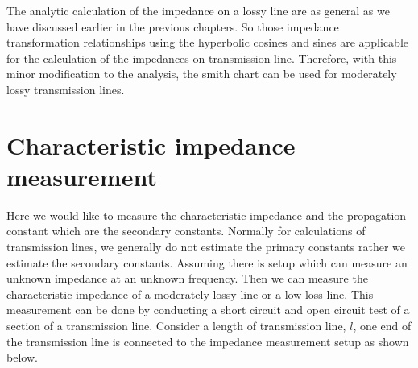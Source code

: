 The analytic calculation of the impedance on a lossy line are as general as we have discussed earlier in the previous chapters. So those impedance transformation relationships using the hyperbolic cosines and sines are applicable for the calculation of the impedances on transmission line. Therefore, with this minor modification to the analysis, the smith chart can be used for moderately lossy transmission lines.

\section{Characteristic impedance measurement}
Here we would like to measure the characteristic impedance and the propagation constant which are the secondary constants. Normally for calculations of transmission lines, we generally do not estimate the primary constants rather we estimate the secondary constants. Assuming there is setup which can measure an unknown impedance at an unknown frequency. Then we can measure the characteristic impedance of a moderately lossy line or a low loss line. This measurement can be done by conducting a short circuit and open circuit test of a section of a transmission line. Consider a length of transmission line, $l$, one end of the transmission line is connected to the impedance measurement setup as shown below.

